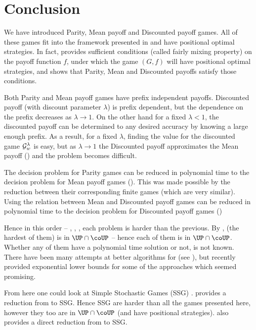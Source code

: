 \chapter{Conclusion}

We have introduced Parity, Mean payoff and Discounted payoff games. All of these games fit into the framework presented in  and have positional optimal strategies. In fact, \cite{pos_mixing} provides sufficient conditions (called fairly mixing property) on the payoff function $f$, under which the game $(G,f)$ will have positional optimal strategies, and shows that Parity, Mean and Discounted payoffs satisfy those conditions.

Both Parity and Mean payoff games have prefix independent payoffs. Discounted payoff (with discount parameter $\lambda$) is prefix dependent, but the dependence on the prefix decreases as $\lambda \to 1$. On the other hand for a fixed $\lambda < 1$, the discounted payoff can be determined to any desired accuracy by knowing a large enough prefix. As a result, for a fixed $\lambda$, finding the value for the discounted game $\mathcal{G}^\lambda_w$ is easy, but as $\lambda \to 1$ the Discounted payoff approximates the Mean payoff () and the problem becomes difficult.

The decision problem for Parity games  can be reduced in polynomial time to the decision problem for Mean payoff games  (). This was made possible by the reduction between their corresponding finite games (which are very similar). Using the relation between Mean and Discounted payoff games  can be reduced in polynomial time to the decision problem for Discounted payoff games  ()

Hence in this order -- , , , each problem is harder than the previous. By ,  (the hardest of them) is in $\UP \cap \coUP$ -- hence each of them is in $\UP \cap \coUP$. Whether any of them have a polynomial time solution or not, is not known. There have been many attempts at better algorithms for  (see \cite[Chap~7]{thomas2002automata}), but recently \cite{ediss13294} provided exponential lower bounds for some of the approaches which seemed promising.

From here one could look at Simple Stochastic Games (SSG) \cite{condon_stochastic}. \cite{zwick_meanpayoff} provides a reduction from  to SSG. Hence SSG are harder than all the games presented here, however they too are in $\UP \cap \coUP$ (and have positional strategies). \cite{parity2ssg} also provides a direct reduction from  to SSG.
